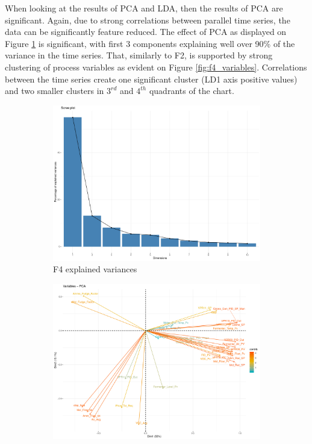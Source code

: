 When looking at the results of PCA and LDA, then the results of PCA are significant. Again, due to strong correlations between parallel time series, the data can be significantly feature reduced. The effect of PCA as displayed on Figure \ref{fig:f4_explained_variances} is significant, with first 3 components explaining well over 90\% of the variance in the time series. That, similarly to F2, is supported by strong clustering of process variables as evident on Figure \ref{fig:f4_variables}. Correlations between the time series create one significant cluster (LD1 axis positive values) and two smaller clusters in $3^{rd}$ and $4^{th}$ quadrants of the chart.

\begin{figure}[ht!]
    \begin{subfigure}{0.3\textwidth}
        \begin{center}
            \includegraphics[width=\textwidth]{plots/f4_explained_variances.pdf}        
        \end{center}
        \caption{F4 explained variances}
        \label{fig:f4_explained_variances}
    \end{subfigure}%
    \begin{subfigure}{0.3\textwidth}
        \begin{center}
        \includegraphics[width=\textwidth]{plots/f4_graph_of_variables.pdf}

\end{center}
\end{subfigure}
\end{figure}
